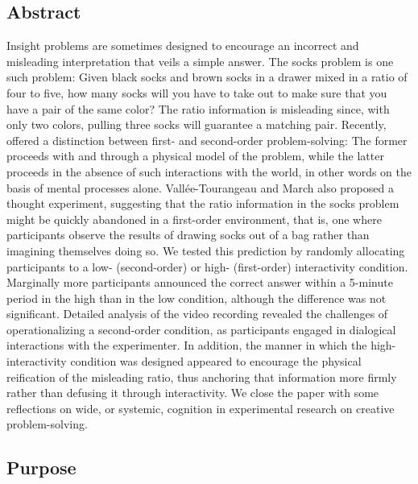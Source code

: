 \documentclass[twocolumn, serif, empirical, authordate]{jote-article}
\begin{document}
\subsection{Abstract}

Insight problems are sometimes designed to encourage an incorrect and misleading interpretation that veils a simple answer. The socks problem is one such problem: Given black socks and brown socks in a drawer mixed in a ratio of four to five, how many socks will you have to take out to make sure that you have a pair of the same color? The ratio information is misleading since, with only two colors, pulling three socks will guarantee a matching pair. Recently, \textcite{Vallée-Tourangeau2020} offered a distinction between first- and second-order problem-solving: The former proceeds with and through a physical model of the problem, while the latter proceeds in the absence of such interactions with the world, in other words on the basis of mental processes alone.
Vallée-Tourangeau and March also proposed a thought experiment, suggesting that the ratio information in the socks problem might be quickly abandoned in a first-order environment, that is, one where participants observe the results of drawing socks out of a bag rather than imagining themselves doing so. We tested this prediction by randomly allocating participants to a low- (second-order) or high- (first-order) interactivity condition. Marginally more participants announced the correct answer within a 5-minute period in the high than in the low condition, although the difference was not significant.
Detailed analysis of the video recording revealed the challenges of operationalizing a second-order condition, as participants engaged in dialogical interactions with the experimenter. In addition, the manner in which the high-interactivity condition was designed appeared to encourage the physical reification of the misleading ratio, thus anchoring that information more firmly rather than defusing it through interactivity. We close the paper with some reflections on wide, or systemic, cognition in experimental research on creative problem-solving.


\subsection{Purpose }
\end{document}
